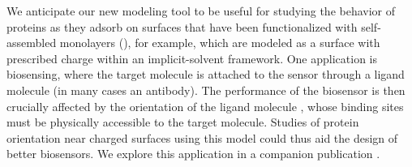 We anticipate our new modeling tool to be useful for studying the behavior of proteins as they adsorb on surfaces that have been functionalized with  self-assembled monolayers (\sam), for example, which are modeled as a surface with prescribed charge within an implicit-solvent framework. 
One application is biosensing, where the target molecule is attached to the sensor through a ligand molecule (in many cases an antibody). The performance of the biosensor is then crucially affected by the orientation of the ligand molecule \cite{TajimaTakaiIshihara2011,TrillingBeekwilderZuilhof2013}, whose binding sites must be physically accessible to the target molecule. Studies of protein orientation near charged surfaces using this model could thus aid the design of better biosensors. We explore this application in a companion publication \cite{CooperBarba2015b}.
